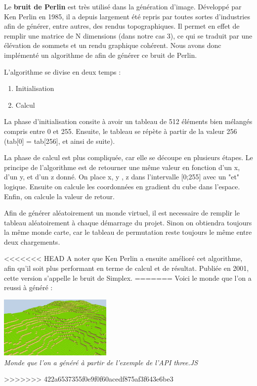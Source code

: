 ﻿Le \textbf{bruit de Perlin} est très utilisé dans la génération d'image. Développé par Ken Perlin en 1985, il a depuis largement été repris par toutes sortes d'industries afin de générer, entre autres, des rendus topographiques.	Il permet en effet de remplir une matrice de N dimensions (dans notre cas 3), ce qui se traduit par une élévation de sommets et un rendu graphique cohérent. Nous avons donc implémenté un algorithme de afin de générer ce bruit de Perlin. 

L'algorithme se divise en deux temps :

\begin{enumerate}
	\item Initialisation
	\item Calcul
\end{enumerate}

La phase d'initialisation consite à avoir un tableau de 512 éléments bien mélangés compris entre 0 et 255. Ensuite, le tableau se répète à partir de la valeur 256 (tab[0] = tab[256], et ainsi de suite). 

La phase de calcul est plus compliquée, car elle se découpe en plusieurs étapes. Le principe de l'algorithme est de retourner une même valeur en fonction d'un x, d'un y, et d'un z donné. On place x, y , z dans l'intervalle [0;255] avec un "et" logique. Ensuite on calcule les coordonnées en gradient du cube dans l'espace. Enfin, on calcule la valeur de retour. 

Afin de générer aléatoirement un monde virtuel, il est necessaire de remplir le tableau aléatoirement à chaque démarrage du projet. Sinon on obtiendra toujours la même monde carte, car le tableau de permutation reste toujours le même entre deux chargements.

<<<<<<< HEAD
A noter que Ken Perlin a ensuite amélioré cet algorithme, afin qu'il soit plus performant en terme de calcul et de résultat. Publiée en 2001, cette version s'appelle le bruit de Simplex.
=======
Voici le monde que l'on a reussi à généré :

\begin{center}
	\null\vspace{0.25cm}
	\includegraphics[height=3cm]{images/OurMinecraftWorld.png}\\
	\textit{Monde que l'on a généré à partir de l'exemple de l'API three.JS}\\
\end{center}
>>>>>>> 422a6537355f0e9f0f60acedf875af3f643e6be3
